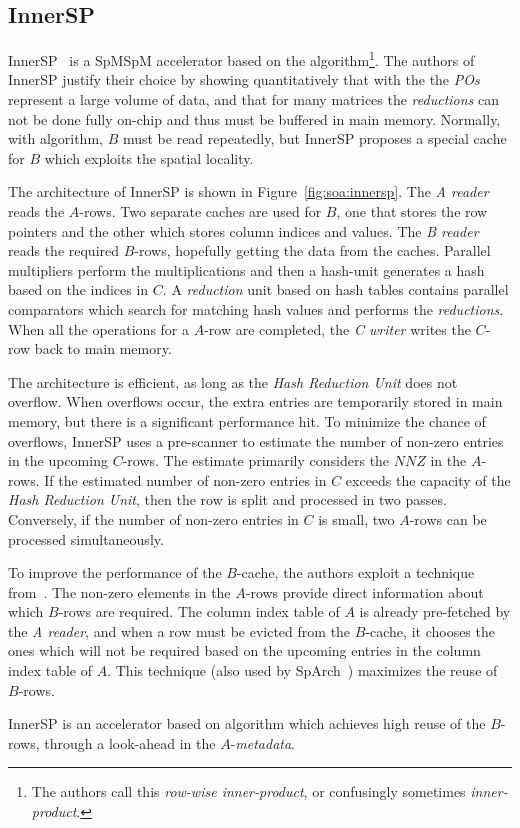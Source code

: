 
\subsection{InnerSP}
\label{sec:soa:innersp}

InnerSP~\cite{Baek2021_InnerSP} is a SpMSpM accelerator based on the  algorithm\footnote{The authors call this \emph{row-wise inner-product}, or confusingly sometimes \emph{inner-product}.}. The authors of InnerSP justify their choice by showing quantitatively that with the  the \emph{POs} represent a large volume of data, and that for many matrices the \emph{reductions} can not be done fully on-chip and thus must be buffered in main memory. Normally, with  algorithm, $B$ must be read repeatedly, but InnerSP proposes a special cache for $B$ which exploits the spatial locality.

The architecture of InnerSP is shown in Figure~\ref{fig:soa:innersp}. The \emph{A reader} reads the $A$-rows. Two separate caches are used for $B$, one that stores the row pointers and the other which stores column indices and values. The \emph{B reader} reads the required $B$-rows, hopefully getting the data from the caches. Parallel multipliers perform the multiplications and then a hash-unit generates a hash based on the indices in $C$. A \emph{reduction} unit based on hash tables contains parallel comparators which search for matching hash values and performs the \emph {reductions}. When all the operations for a $A$-row are completed, the \emph{C writer} writes the $C$-row back to main memory.


The architecture is efficient, as long as the \emph{Hash Reduction Unit} does not overflow. When overflows occur, the extra entries are temporarily stored in main memory, but there is a significant performance hit. To minimize the chance of overflows, InnerSP uses a pre-scanner to estimate the number of non-zero entries in the upcoming $C$-rows. The estimate primarily considers the $NNZ$ in the $A$-rows. If the estimated number of non-zero entries in $C$ exceeds the capacity of the \emph{Hash Reduction Unit}, then the row is split and processed in two passes. Conversely, if the number of non-zero entries in $C$ is small, two $A$-rows can be processed simultaneously.

To improve the performance of the $B$-cache, the authors exploit a technique from~\cite{Balaji2021_Popt}. The non-zero elements in the $A$-rows provide direct information about which $B$-rows are required. The column index table of $A$ is already pre-fetched by the \emph{A reader}, and when a row must be evicted from the $B$-cache, it chooses the ones which will not be required based on the upcoming entries in the column index table of $A$. This technique (also used by SpArch~\cite{Zhekai2020_SpArch}) maximizes the reuse of $B$-rows.

InnerSP is an accelerator based on  algorithm which achieves high reuse of the $B$-rows, through a look-ahead in the $A$-\emph{metadata}.